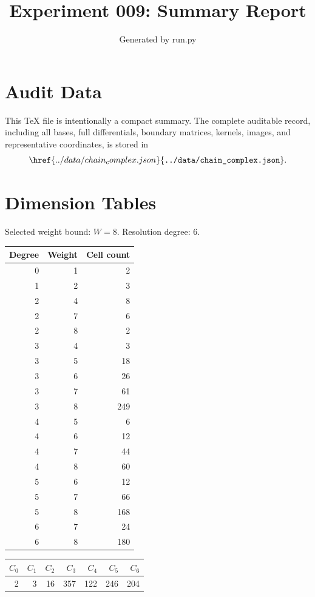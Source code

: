 \documentclass[11pt]{article}
\title{Experiment 009: Summary Report}
\author{Generated by run.py}
\date{}
\begin{document}
\maketitle

\section{Audit Data}
This TeX file is intentionally a compact summary.  The complete auditable record, including all bases, full differentials, boundary matrices, kernels, images, and representative coordinates, is stored in
\[
\href{../data/chain_complex.json}{\texttt{../data/chain\_complex.json}}.
\]

\section{Dimension Tables}
Selected weight bound: $W=8$.  Resolution degree: 6.

\begin{center}
\begin{tabular}{rrr}
\toprule
Degree & Weight & Cell count \\
\midrule
0 & 1 & 2 \\
1 & 2 & 3 \\
2 & 4 & 8 \\
2 & 7 & 6 \\
2 & 8 & 2 \\
3 & 4 & 3 \\
3 & 5 & 18 \\
3 & 6 & 26 \\
3 & 7 & 61 \\
3 & 8 & 249 \\
4 & 5 & 6 \\
4 & 6 & 12 \\
4 & 7 & 44 \\
4 & 8 & 60 \\
5 & 6 & 12 \\
5 & 7 & 66 \\
5 & 8 & 168 \\
6 & 7 & 24 \\
6 & 8 & 180 \\
\bottomrule
\end{tabular}
\end{center}

\begin{center}
\begin{tabular}{rrrrrrr}
\toprule
\(C_0\) & \(C_1\) & \(C_2\) & \(C_3\) & \(C_4\) & \(C_5\) & \(C_6\) \\
\midrule
2 & 3 & 16 & 357 & 122 & 246 & 204 \\
\bottomrule
\end{tabular}
\end{center}
\end{document}

